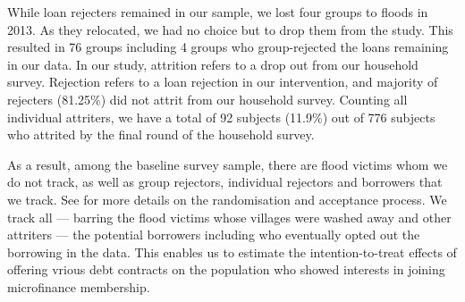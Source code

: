 	While loan rejecters remained in our sample, we lost four groups to floods in 2013. As they relocated, we had no choice but to drop them from the study. This resulted in 76 groups including 4 groups who group-rejected the loans remaining in our data. In our study, attrition refers to a drop out from our household survey. Rejection refers to a loan rejection in our intervention, and majority of rejecters (81.25\%) did not attrit from our household survey. Counting all individual attriters, we have a total of 92 subjects (11.9\%) out of 776 subjects who attrited by the final round of the household survey. 

	As a result, among the baseline survey sample, there are flood victims whom we do not track, as well as group rejectors, individual rejectors and borrowers that we track. See \citet{GUK2016} for more details on the randomisation and acceptance process. We track all --- barring the flood victims whose villages were washed away and other attriters --- the potential borrowers including who eventually opted out the borrowing in the data. This enables us to estimate the intention-to-treat effects of offering vrious debt contracts on the population who showed interests in joining microfinance membership. 

